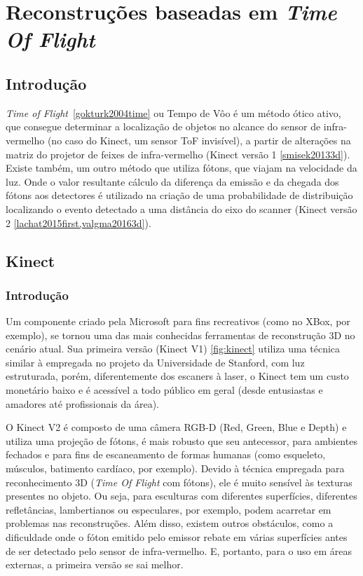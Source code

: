 \chapter{Reconstruções baseadas em \emph{Time Of Flight}}\label{cap:kinect}

\section*{Introdução}

\emph{Time of Flight}~\ref{gokturk2004time} ou Tempo de Vôo é um método ótico ativo, que consegue determinar a localização de objetos no alcance do sensor de infra-vermelho (no caso do Kinect, um sensor ToF invisível), a partir de alterações na matriz do projetor de feixes de infra-vermelho (\eg Kinect versão 1 \ref{smisek20133d}). Existe também, um outro método que utiliza fótons, que viajam na velocidade da luz. Onde o valor resultante cálculo da diferença da emissão e da chegada dos fótons aos detectores é utilizado na criação de uma probabilidade de distribuição localizando o evento detectado a uma distância do eixo do scanner (\eg Kinect versão 2 \ref{lachat2015first,valgma20163d}). 

\section{Kinect}

\subsection*{Introdução}

Um componente criado pela Microsoft para fins recreativos (como no XBox, por exemplo), se tornou uma das mais conhecidas ferramentas de reconstrução 3D no cenário atual. Sua primeira versão (Kinect V1) \ref{fig:kinect} utiliza uma técnica similar à empregada no projeto da Universidade de Stanford, com luz estruturada, porém, diferentemente dos escaners à laser, o Kinect tem um custo monetário baixo e é acessível a todo público em geral (desde entusiastas e amadores até profissionais da área). 

O Kinect V2 é composto de uma câmera RGB-D (Red, Green, Blue e Depth) e utiliza uma projeção de fótons, é mais robusto que seu antecessor, para ambientes fechados e para fins de escaneamento de formas humanas (como esqueleto, músculos, batimento cardíaco, por exemplo). Devido à técnica empregada para reconhecimento 3D (\emph{Time Of Flight} com fótons), ele é muito sensível às texturas presentes no objeto. Ou seja, para esculturas com diferentes superfícies, diferentes refletâncias, lambertianos ou especulares, por exemplo, podem acarretar em problemas nas reconstruções. Além disso, existem outros obstáculos, como a dificuldade onde o fóton emitido pelo emissor rebate em várias superfícies antes de ser detectado pelo sensor de infra-vermelho. E, portanto, para o uso em áreas externas, a primeira versão se sai melhor.

